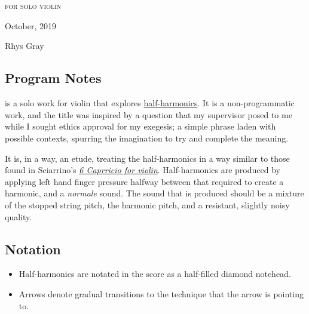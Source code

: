 \newpage

\chapter[\violinPiece]{}


\vspace*{3cm}
\begin{center}
\textsc{for solo violin}
\vspace*{3.5cm}

\HRule{0.5pt}


\LARGE \textbf{\uppercase{\violinPiece}}
\HRule{2pt}

\vspace{1.3cm}

\normalsize October, 2019
\date{}

\vspace*{5\baselineskip}

Rhys Gray

\end{center}
\newpage
\section*{Program Notes}
\violinPiece\space is a solo work for violin that explores \hyperref[sec:half-harmonics]{half-harmonics}.
It is a non-programmatic work, and the title was inspired by a question that my supervisor posed to me while I sought ethics approval for my exegesis; a simple phrase laden with possible contexts, spurring the imagination to try and complete the meaning.

It is, in a way, an etude, treating the half-harmonics in a way similar to those found in Sciarrino's \hyperref[fig:sciarrinoExcerpt]{\emph{6 Caprricio for violin}}. 
Half-harmonics are produced by applying left hand finger pressure halfway between that required to create a harmonic, and a \emph{normale} sound. 
The sound that is produced should be a mixture of the stopped string pitch, the harmonic pitch, and a resistant, slightly noisy quality.

\section*{Notation}
\begin{itemize}

    \item Half-harmonics are notated in the score as a half-filled diamond notehead.
    \item Arrows denote gradual transitions to the technique that the arrow is pointing to.
\end{itemize}

\newpage\label{violinPiece}
